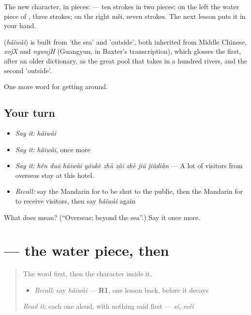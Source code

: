 The new character, in pieces:  — ten strokes in two pieces: on the left the water piece of , three strokes; on the right  měi, seven strokes. The next lesson puts it in your hand.

\begin{cousinweb}
\textbf{} (\emph{hǎiwài}) is built from  'the sea' and  'outside', both inherited from Middle Chinese, \emph{xojX} and \emph{ngwajH} (Guangyun, in Baxter's transcription), which glosses the first, after an older dictionary, as the great pool that takes in a hundred rivers, and the second 'outside'.
\end{cousinweb}

\begin{grammarlens}[title={What you've built}]
One more word for getting around.
\end{grammarlens}

\subsection*{Your turn}
\begin{itemize}
\raggedright
  \item \emph{Say it:} \emph{hǎiwài}
  \item \emph{Say it:} \emph{hǎiwài}, once more
  \item \emph{Say it:} \emph{hěn duō hǎiwài yóukè zhù zài zhè jiā jiǔdiàn} — A lot of visitors from overseas stay at this hotel.
  \item \emph{Recall:} say the Mandarin for to be shut to the public, then the Mandarin for to receive visitors, then say \emph{hǎiwài} again
\end{itemize}

\begin{tcolorbox}[breakable,colback=teal!4,colframe=teal!35!black,title={Before you move on}]
What does  mean? (\textquotedblleft{}Overseas; beyond the sea\textquotedblright{}.) Say it once more.
\end{tcolorbox}
\section[\texorpdfstring{\zh{海} (hǎi)}{海 (hǎi)}]{ — the water piece, then }

\label{lesson:ZH-W433-hai-sea}



\begin{quote}
The word first, then the character inside it.

\begin{itemize}
\raggedright
  \item \emph{Recall:} say \emph{hǎiwài} — \textbf{R1}, one lesson back, before it decays
\end{itemize}

\begin{quote}
 
\end{quote}

\emph{Read it:} each one aloud, with nothing said first — \emph{xǐ}, \emph{měi}
\end{quote}

